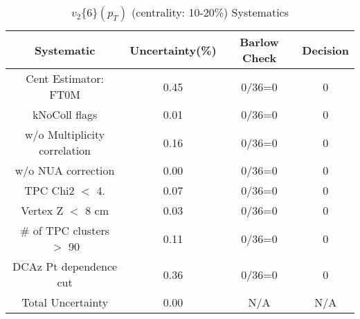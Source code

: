 \begin{table}[htbp]
\caption{$v_2\{6\}(p_{T})$ (centrality: 10-20\%) Systematics}
\label{tab:Sys_pTDiffv26ChFull}
\centering
\begin{tabular}{|c|c|c|c|}
\hline
Systematic & Uncertainty(\%) & Barlow Check & Decision \\
\hline
Cent Estimator: FT0M & 0.45 & 0/36=0 & 0 \\
kNoColl flags & 0.01 & 0/36=0 & 0 \\
w/o Multiplicity correlation & 0.16 & 0/36=0 & 0 \\
w/o NUA correction & 0.00 & 0/36=0 & 0 \\
TPC Chi2 $<$ 4. & 0.07 & 0/36=0 & 0 \\
Vertex Z $<$ 8 cm & 0.03 & 0/36=0 & 0 \\
\# of TPC clusters $>$ 90 & 0.11 & 0/36=0 & 0 \\
DCAz Pt dependence cut & 0.36 & 0/36=0 & 0 \\
\hline
Total Uncertainty & 0.00 & N/A & N/A \\
\hline
\end{tabular}
\end{table}
